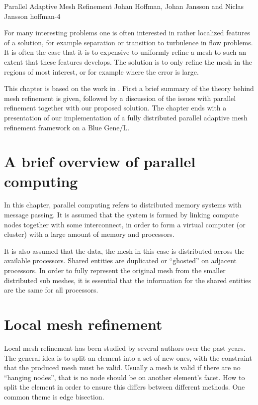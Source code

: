               {Parallel Adaptive Mesh Refinement}
              {Johan Hoffman, Johan Jansson and Niclas Jansson}
              {hoffman-4}

For many interesting problems one is often interested in rather
localized features of a solution, for example separation or transition
to turbulence in flow problems. It is often the case that it is to
expensive to uniformly refine a mesh to such an extent that these
features develops. The solution is to only refine the mesh in the
regions of most interest, or for example where the error is large.

This chapter is based on the work in \cite{Jan2008a}. First a brief
summary of the theory behind mesh refinement is given, followed by a
discussion of the issues with parallel refinement together with our
proposed solution. The chapter ends with a presentation of our
implementation of a fully distributed parallel adaptive mesh
refinement framework on a Blue Gene/L.


\section{A brief overview of parallel computing}
\label{sect:para}

In this chapter, parallel computing refers to distributed memory
systems with message passing. It is assumed that the system is formed
by linking compute nodes together with some interconnect, in order to
form a virtual computer (or cluster) with a large amount of memory and
processors.

It is also assumed that the data, the mesh in this case is distributed
across the available processors. Shared entities are duplicated or
``ghosted'' on adjacent processors. In order to fully represent the
original mesh from the smaller distributed sub meshes, it is essential
that the information for the shared entities are the same for all
processors.

\section{Local mesh refinement}

Local mesh refinement has been studied by several authors over the
past years. The general idea is to split an element into a set of new
ones, with the constraint that the produced mesh must be
valid. Usually a mesh is valid if there are no ``hanging nodes'', that
is no node should be on another element's facet. How to split the
element in order to ensure this differs between different methods. One
common theme is edge bisection.

